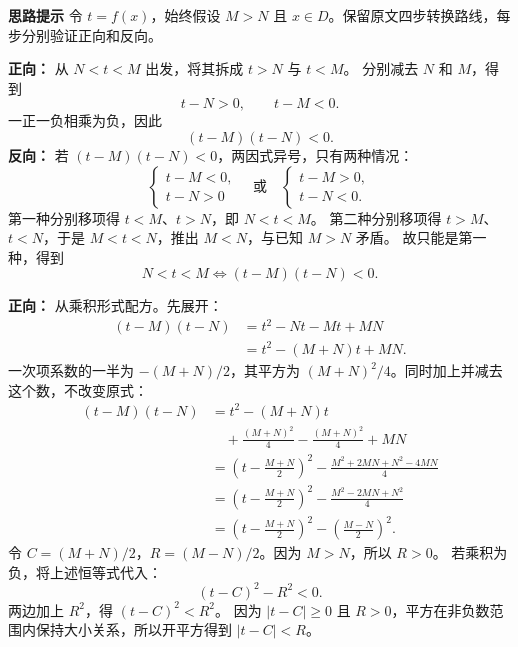 \begin{proofbox}
\textbf{\textcolor{CProof}{思路提示}} 令 $t=f(x)$，始终假设 $M>N$ 且 $x\in D$。保留原文四步转换路线，每步分别验证正向和反向。
\begin{description}[style=nextline,leftmargin=2.8em,labelsep=0.5em,itemsep=0.55em]
\item[\textbf{步骤一（乘积形式）：}]
\textbf{正向：} 从 $N<t<M$ 出发，将其拆成 $t>N$ 与 $t<M$。
分别减去 $N$ 和 $M$，得到
\[t-N>0,\qquad t-M<0.\]
一正一负相乘为负，因此
\[(t-M)(t-N)<0.\]
\textbf{反向：} 若 $(t-M)(t-N)<0$，两因式异号，只有两种情况：
\[
\begin{cases}t-M<0,\\t-N>0\end{cases}
\quad\text{或}\quad
\begin{cases}t-M>0,\\t-N<0.\end{cases}
\]
第一种分别移项得 $t<M$、$t>N$，即 $N<t<M$。
第二种分别移项得 $t>M$、$t<N$，于是 $M<t<N$，推出 $M<N$，与已知 $M>N$ 矛盾。
故只能是第一种，得到
\[N<t<M\iff(t-M)(t-N)<0.\]
\item[\textbf{步骤二（绝对值形式）：}]
\textbf{正向：} 从乘积形式配方。先展开：
\begin{align*}
(t-M)(t-N)&=t^2-Nt-Mt+MN\\
&=t^2-(M+N)t+MN.
\end{align*}
一次项系数的一半为 $-(M+N)/2$，其平方为 $(M+N)^2/4$。同时加上并减去这个数，不改变原式：
\begin{align*}
(t-M)(t-N)&=t^2-(M+N)t\\
&\quad+\frac{(M+N)^2}{4}-\frac{(M+N)^2}{4}+MN\\
&=\left(t-\frac{M+N}{2}\right)^2
-\frac{M^2+2MN+N^2-4MN}{4}\\
&=\left(t-\frac{M+N}{2}\right)^2
-\frac{M^2-2MN+N^2}{4}\\
&=\left(t-\frac{M+N}{2}\right)^2
-\left(\frac{M-N}{2}\right)^2.
\end{align*}
令 $C=(M+N)/2$，$R=(M-N)/2$。因为 $M>N$，所以 $R>0$。
若乘积为负，将上述恒等式代入：
\[(t-C)^2-R^2<0.\]
两边加上 $R^2$，得 $(t-C)^2<R^2$。
因为 $|t-C|\ge0$ 且 $R>0$，平方在非负数范围内保持大小关系，所以开平方得到 $|t-C|<R$。


\end{description}
\end{proofbox}
